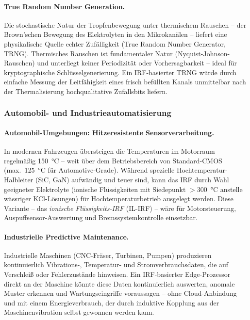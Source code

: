 ﻿\documentclass[a4paper,12pt]{scrreprt}
\theoremstyle{definition}
\begin{document}
\paragraph{True Random Number Generation.}
Die stochastische Natur der Tropfenbewegung unter thermischem Rauschen
-- der Brown'schen Bewegung des Elektrolyten in den Mikrokanälen --
liefert eine physikalische Quelle echter Zufälligkeit (True Random Number
Generator, TRNG). Thermisches Rauschen ist fundamentaler Natur
(Nyquist-Johnson-Rauschen) und unterliegt keiner Periodizität oder
Vorhersagbarkeit -- ideal für kryptographische Schlüsselgenerierung.
Ein IRF-basierter TRNG würde durch einfache Messung der Leitfähigkeit
eines frisch befüllten Kanals unmittelbar nach der Thermalisierung
hochqualitative Zufallsbits liefern.

\subsubsection{Automobil- und Industrieautomatisierung}
\label{subsubsec:automobil}

\paragraph{Automobil-Umgebungen: Hitzeresistente Sensorverarbeitung.}
In modernen Fahrzeugen übersteigen die Temperaturen im Motorraum
regelmäßig 150\, °C -- weit über dem Betriebsbereich von Standard-CMOS
(max.\ 125\, °C für Automotive-Grade). Während spezielle
Hochtemperatur-Halbleiter (SiC, GaN) aufwändig und teuer sind,
kann das IRF durch Wahl geeigneter Elektrolyte (ionische Flüssigkeiten
mit Siedepunkt $> 300$\, °C anstelle wässriger KCl-Lösungen) für
Hochtemperaturbetrieb ausgelegt werden. Diese Variante -- das
\emph{ionische Flüssigkeits-IRF} (IL-IRF) -- wäre für Motorsteuerung,
Auspuffsensor-Auswertung und Bremssystemkontrolle einsetzbar.

\paragraph{Industrielle Predictive Maintenance.}
Industrielle Maschinen (CNC-Fräser, Turbinen, Pumpen) produzieren
kontinuierlich Vibrations-, Temperatur- und Stromverbrauchsdaten,
die auf Verschleiß oder Fehlerzustände hinweisen. Ein IRF-basierter
Edge-Prozessor direkt an der Maschine könnte diese Daten kontinuierlich
auswerten, anomale Muster erkennen und Wartungseingriffe voraussagen --
ohne Cloud-Anbindung und mit einem Energieverbrauch, der durch
induktive Kopplung aus der Maschinenvibration selbst gewonnen werden kann.
\end{document}
